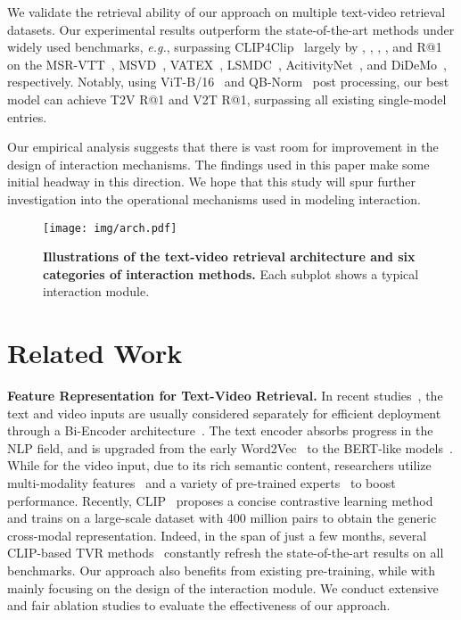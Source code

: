 \documentclass[runningheads]{llncs}
\begin{document}
We validate the retrieval ability of our approach on multiple text-video retrieval datasets. 
Our experimental results outperform the state-of-the-art methods under widely used benchmarks, \textit{e.g.}, surpassing CLIP4Clip~\cite{clip4clip} largely by , , , ,  and  R@1 on the MSR-VTT~\cite{msrvtt}, MSVD~\cite{msvd}, VATEX~\cite{vatex}, LSMDC~\cite{lsmdc}, AcitivityNet~\cite{anet}, and DiDeMo~\cite{didemo}, respectively.
Notably, using ViT-B/16~\cite{clip} and QB-Norm~\cite{qbnorm} post processing, our best model can achieve  T2V R@1 and  V2T R@1, surpassing all existing single-model entries.

Our empirical analysis suggests that there is vast room for improvement in the design of interaction mechanisms. 
The findings used in this paper make some initial headway in this direction. We hope that this study will spur further investigation into the operational mechanisms used in modeling interaction.

\begin{figure}[t]
\centering
\texttt{[image: img/arch.pdf]}
\vspace{-2mm}
\caption{\textbf{Illustrations of the text-video retrieval architecture and six categories of interaction methods.} Each subplot shows a typical interaction module.}
\label{fig:arch}
\end{figure}

 
\section{Related Work}
\noindent\textbf{Feature Representation for Text-Video Retrieval.}
In recent studies~\cite{ce,clip,sclip,clip4clip}, the text and video inputs are usually considered separately for efficient deployment through a Bi-Encoder architecture~\cite{biencoder,colbert}.
The text encoder absorbs progress in the NLP field, and is upgraded from the early Word2Vec~\cite{w2v} to the BERT-like models~\cite{bert,roberta}.
While for the video input, due to its rich semantic content, researchers utilize multi-modality features~\cite{mmt} and a variety of pre-trained experts~\cite{ce} to boost performance.
Recently, CLIP~\cite{clip} proposes a concise contrastive learning method and trains on a large-scale dataset with 400 million pairs to obtain the generic cross-modal representation.
Indeed, in the span of just a few months, several CLIP-based TVR methods~\cite{clip4clip,clip2tv,clip2video} constantly refresh the state-of-the-art results on all benchmarks.
Our approach also benefits from existing pre-training, while with mainly focusing on the design of the interaction module. 
We conduct extensive and fair ablation studies to evaluate the effectiveness of our approach.
\end{document}

